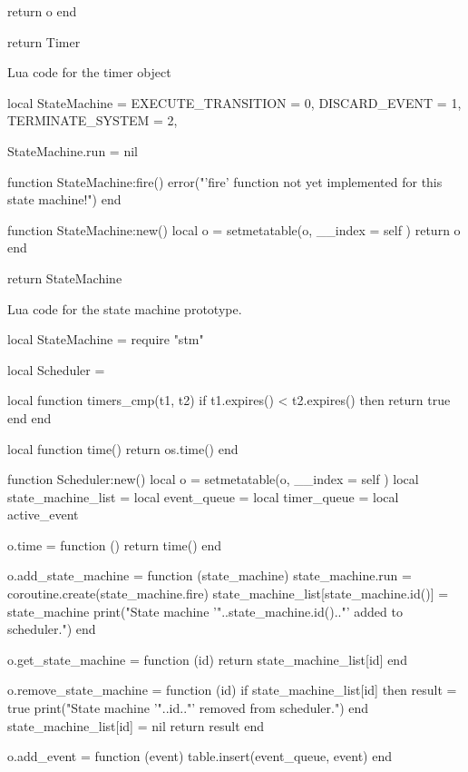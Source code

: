 \begin{appendices}
\begin{listing}[htp]
\begin{luacode}
	return o
end

return Timer
\end{luacode}
	\caption{Lua code for the timer object }
	\label{code:timer}
\end{listing}

\begin{listing}[htp]
\begin{luacode}
local StateMachine = {
	EXECUTE_TRANSITION = 0,
	DISCARD_EVENT = 1,
	TERMINATE_SYSTEM = 2,
}

StateMachine.run = nil

function StateMachine:fire()
	error("'fire' function not yet implemented for this state machine!")
end

function StateMachine:new()
	local o = {}
	setmetatable(o, { __index = self })
	return o
end

return StateMachine
\end{luacode}
	\caption{Lua code for the state machine prototype.}
	\label{code:stm}
\end{listing}

\begin{listing}[htp]
\begin{luacode}
local StateMachine = require "stm"

local Scheduler = {}

local function timers_cmp(t1, t2)
	if t1.expires() < t2.expires() then return true end
end

local function time()
	return os.time()
end

function Scheduler:new()
	local o = {}
	setmetatable(o, { __index = self })
	local state_machine_list = {}
	local event_queue = {}
	local timer_queue = {}
	local active_event

	o.time = function ()
		return time()
	end

	o.add_state_machine = function (state_machine)
		state_machine.run = coroutine.create(state_machine.fire)
		state_machine_list[state_machine.id()] = state_machine
		print("State machine '"..state_machine.id().."' added to scheduler.")
	end

	o.get_state_machine = function (id)
		return state_machine_list[id]
	end

	o.remove_state_machine = function (id)
		if state_machine_list[id] then
			result = true
			print("State machine '"..id.."' removed from scheduler.")
		end
		state_machine_list[id] = nil
		return result
	end

	o.add_event = function (event)
		table.insert(event_queue, event)
	end


\end{luacode}
\end{listing}
\end{appendices}
